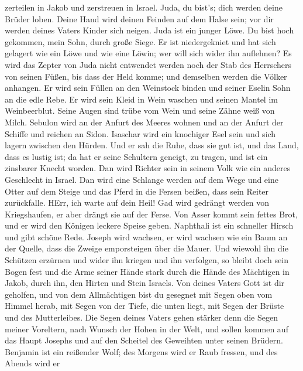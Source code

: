 zerteilen in Jakob und zerstreuen in Israel.  Juda, du
bist's; dich werden deine Brüder loben. Deine Hand wird deinen Feinden
auf dem Halse sein; vor dir werden deines Vaters Kinder sich neigen.
 Juda ist ein junger Löwe. Du bist hoch gekommen, mein Sohn,
durch große Siege. Er ist niedergekniet und hat sich gelagert wie ein
Löwe und wie eine Löwin; wer will sich wider ihn auflehnen?
 Es wird das Zepter von Juda nicht entwendet werden noch
der Stab des Herrschers von seinen Füßen, bis dass der Held komme; und
demselben werden die Völker anhangen.  Er wird sein Füllen
an den Weinstock binden und seiner Eselin Sohn an die edle Rebe. Er wird
sein Kleid in Wein waschen und seinen Mantel im Weinbeerblut.
 Seine Augen sind trübe vom Wein und seine Zähne weiß von
Milch.  Sebulon wird an der Anfurt des Meeres wohnen und an
der Anfurt der Schiffe und reichen an Sidon.  Isaschar wird
ein knochiger Esel sein und sich lagern zwischen den Hürden.
 Und er sah die Ruhe, dass sie gut ist, und das Land, dass
es lustig ist; da hat er seine Schultern geneigt, zu tragen, und ist ein
zinsbarer Knecht worden.  Dan wird Richter sein in seinem
Volk wie ein anderes Geschlecht in Israel.  Dan wird eine
Schlange werden auf dem Wege und eine Otter auf dem Steige und das Pferd
in die Fersen beißen, dass sein Reiter zurückfalle.  HErr,
ich warte auf dein Heil!  Gad wird gedrängt werden von
Kriegshaufen, er aber drängt sie auf der Ferse.  Von Asser
kommt sein fettes Brot, und er wird den Königen leckere Speise geben.
 Naphthali ist ein schneller Hirsch und gibt schöne Rede.
 Joseph wird wachsen, er wird wachsen wie ein Baum an der
Quelle, dass die Zweige emporsteigen über die Mauer.  Und
wiewohl ihn die Schützen erzürnen und wider ihn kriegen und ihn
verfolgen,  so bleibt doch sein Bogen fest und die Arme
seiner Hände stark durch die Hände des Mächtigen in Jakob, durch ihn,
den Hirten und Stein Israels.  Von deines Vaters Gott ist
dir geholfen, und von dem Allmächtigen bist du gesegnet mit Segen oben
vom Himmel herab, mit Segen von der Tiefe, die unten liegt, mit Segen
der Brüste und des Mutterleibes.  Die Segen deines Vaters
gehen stärker denn die Segen meiner Voreltern, nach Wunsch der Hohen in
der Welt, und sollen kommen auf das Haupt Josephs und auf den Scheitel
des Geweihten unter seinen Brüdern.  Benjamin ist ein
reißender Wolf; des Morgens wird er Raub fressen, und des Abends wird er
